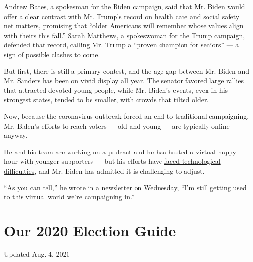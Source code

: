 Andrew Bates, a spokesman for the Biden campaign, said that Mr. Biden
would offer a clear contrast with Mr. Trump's record on health care and
\href{https://www.nytimes.com/2020/01/22/us/politics/medicare-trump.html}{social
safety net matters}, promising that ``older Americans will remember
whose values align with theirs this fall.'' Sarah Matthews, a
spokeswoman for the Trump campaign, defended that record, calling Mr.
Trump a ``proven champion for seniors'' --- a sign of possible clashes
to come.

But first, there is still a primary contest, and the age gap between Mr.
Biden and Mr. Sanders has been on vivid display all year. The senator
favored large rallies that attracted devoted young people, while Mr.
Biden's events, even in his strongest states, tended to be smaller, with
crowds that tilted older.

Now, because the coronavirus outbreak forced an end to traditional
campaigning, Mr. Biden's efforts to reach voters --- old and young ---
are typically online anyway.

He and his team are working on a podcast and he has hosted a virtual
happy hour with younger supporters --- but his efforts have
\href{https://www.nytimes.com/2020/03/13/us/politics/joe-biden-digital-campaign.html}{faced
technological difficulties}, and Mr. Biden has admitted it is
challenging to adjust.

``As you can tell,'' he wrote in a newsletter on Wednesday, ``I'm still
getting used to this virtual world we're campaigning in.''

\hypertarget{our-2020-election-guide}{%
\section{Our 2020 Election Guide}\label{our-2020-election-guide}}

Updated Aug. 4, 2020

